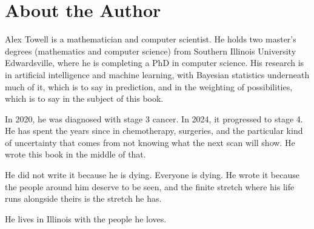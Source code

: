 \chapter*{About the Author}

Alex Towell is a mathematician and computer scientist. He holds two master's degrees (mathematics and computer science) from Southern Illinois University Edwardsville, where he is completing a PhD in computer science. His research is in artificial intelligence and machine learning, with Bayesian statistics underneath much of it, which is to say in prediction, and in the weighting of possibilities, which is to say in the subject of this book.

In 2020, he was diagnosed with stage 3 cancer. In 2024, it progressed to stage 4. He has spent the years since in chemotherapy, surgeries, and the particular kind of uncertainty that comes from not knowing what the next scan will show. He wrote this book in the middle of that.

He did not write it because he is dying. Everyone is dying. He wrote it because the people around him deserve to be seen, and the finite stretch where his life runs alongside theirs is the stretch he has.

He lives in Illinois with the people he loves.
